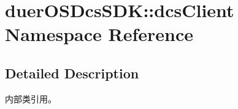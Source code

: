 \hypertarget{namespaceduerOSDcsSDK_1_1dcsClient}{}\section{duer\+O\+S\+Dcs\+S\+DK\+:\+:dcs\+Client Namespace Reference}
\label{namespaceduerOSDcsSDK_1_1dcsClient}


\subsection{Detailed Description}
内部类引用。 
